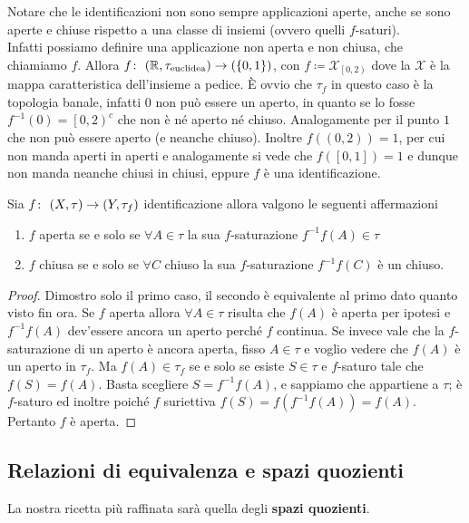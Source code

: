 \begin{remark}
	Notare che le identificazioni non sono sempre applicazioni aperte, anche se sono aperte e chiuse rispetto a una classe di insiemi (ovvero quelli $f$-saturi). \\ Infatti possiamo definire una applicazione non aperta e non chiusa, che chiamiamo $f$. Allora $f \colon\ (\mathbb{R}, \tau_{\text{euclidea}}) \rightarrow (\left\{0,1\right\})$, con $f \coloneqq \mathcal{X}_{\left[0,2\right)}$ dove la $\mathcal{X}$ è la mappa caratteristica dell'insieme a pedice. È ovvio che $\tau_f$ in questo caso è la topologia banale, infatti $0$ non può essere un aperto, in quanto se lo fosse $f^{-1}(0) = \left[0, 2\right)^c$ che non  è né aperto né chiuso. Analogamente per il punto $1$ che non può essere aperto (e neanche chiuso). Inoltre $f((0,2)) = 1$, per cui non manda aperti in aperti e analogamente si vede che $f(\left[0,1\right]) = 1$ e dunque non manda neanche chiusi in chiusi, eppure $f$ è una identificazione.
\end{remark}

\begin{theorem}
	Sia $f \colon\ (X,\tau) \rightarrow (Y, \tau_f)$ identificazione allora valgono le seguenti affermazioni
	\begin{enumerate}
		\item $f$ aperta se e solo se $\forall A \in \tau$ la sua $f$-saturazione $f^{-1}f(A) \in \tau$
		\item $f$ chiusa se e solo se $\forall C$ chiuso la sua $f$-saturazione $f^{-1}f(C)$ è un chiuso.
	\end{enumerate}
\end{theorem}
\begin{proof}
	Dimostro solo il primo caso, il secondo è equivalente al primo dato quanto visto fin ora. Se $f$ aperta allora $\forall A \in \tau$ risulta che $f(A)$ è aperta per ipotesi e $f^{-1}f(A)$ dev'essere ancora un aperto perché $f$ continua. Se invece vale che la $f$-saturazione di un aperto è ancora aperta, fisso $A \in \tau$ e voglio vedere che $f(A)$ è un aperto in $\tau_f$. Ma $f(A) \in \tau_f$ se e solo se esiste $S \in \tau$ e $f$-saturo tale che $f(S) = f(A)$. Basta scegliere $S = f^{-1}f(A)$, e sappiamo che appartiene a $\tau$; è $f$-saturo ed inoltre poiché $f$ suriettiva $f(S) = f(f^{-1}f(A)) = f(A)$. Pertanto $f$ è aperta. 
\end{proof}



\subsection{\textcolor{TopGener}{\textbf{Relazioni di equivalenza e spazi quozienti}}}
La nostra ricetta più raffinata sarà quella degli \textbf{spazi quozienti}. 

